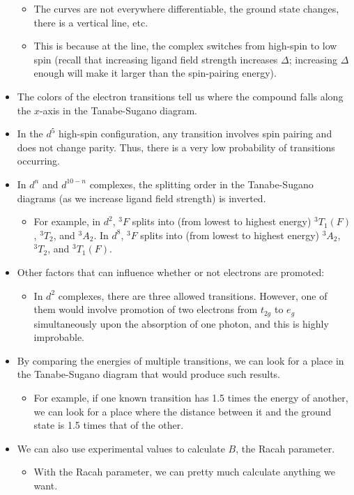 \documentclass[../notes.tex]{subfiles}
\begin{document}
\begin{itemize}
\begin{itemize}
        \item The curves are not everywhere differentiable, the ground state changes, there is a vertical line, etc.
        \item This is because at the line, the complex switches from high-spin to low spin (recall that increasing ligand field strength increases $\Delta$; increasing $\Delta$ enough will make it larger than the spin-pairing energy).
    \end{itemize}
    \item The colors of the electron transitions tell us where the compound falls along the $x$-axis in the Tanabe-Sugano diagram.
    \item In the $d^5$ high-spin configuration, any transition involves spin pairing and does not change parity. Thus, there is a very low probability of transitions occurring.
    \item In $d^n$ and $d^{10-n}$ complexes, the splitting order in the Tanabe-Sugano diagrams (as we increase ligand field strength) is inverted.
    \begin{itemize}
        \item For example, in $d^2$, ${}^3F$ splits into (from lowest to highest energy) ${}^3T_1(F)$, ${}^3T_2$, and ${}^3A_2$. In $d^8$, ${}^3F$ splits into (from lowest to highest energy) ${}^3A_2$, ${}^3T_2$, and ${}^3T_1(F)$.
    \end{itemize}
    \item Other factors that can influence whether or not electrons are promoted:
    \begin{itemize}
        \item In $d^2$ complexes, there are three allowed transitions. However, one of them would involve promotion of two electrons from $t_{2g}$ to $e_g$ simultaneously upon the absorption of one photon, and this is highly improbable.
    \end{itemize}
    \item By comparing the energies of multiple transitions, we can look for a place in the Tanabe-Sugano diagram that would produce such results.
    \begin{itemize}
        \item For example, if one known transition has 1.5 times the energy of another, we can look for a place where the distance between it and the ground state is 1.5 times that of the other.
    \end{itemize}
    \item We can also use experimental values to calculate $B$, the Racah parameter.
    \begin{itemize}
        \item With the Racah parameter, we can pretty much calculate anything we want.
    \end{itemize}
\end{itemize}
\end{document}
